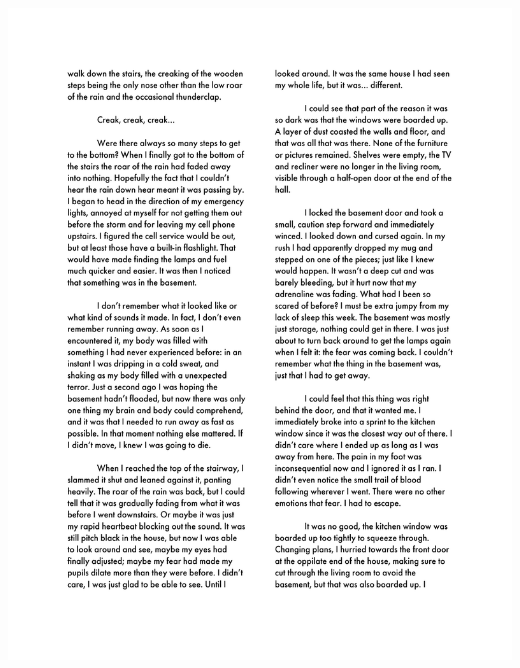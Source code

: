 \begin{center}
     \includegraphics[scale=0.75]{Scores/Raindrops Text_Part3.pdf}
\end{center}
\newpage
